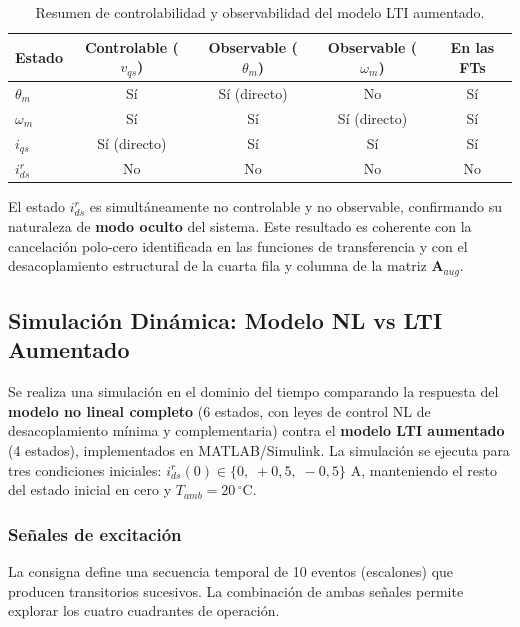 \documentclass[12pt, a4paper,journal, onecolumn, compsoc]{IEEEtran}
\begin{document}
\begin{table}[H]
\centering
\caption{Resumen de controlabilidad y observabilidad del modelo LTI aumentado.}
\label{tab:ctrl_obs}
\renewcommand{\arraystretch}{1.3}
\begin{tabular}{|l|c|c|c|c|}
\hline
\textbf{Estado} & \textbf{Controlable} ($v_{qs}$) & \textbf{Observable} ($\theta_m$) & \textbf{Observable} ($\omega_m$) & \textbf{En las FTs} \\
\hline
$\theta_m$   & Sí & Sí (directo) & No & Sí \\
$\omega_m$   & Sí & Sí           & Sí (directo) & Sí \\
$i_{qs}$     & Sí (directo) & Sí      & Sí & Sí \\
$i_{ds}^r$   & No & No            & No & No \\
\hline
\end{tabular}
\end{table}

El estado $i_{ds}^r$ es simultáneamente no controlable y no observable, confirmando su naturaleza de \textbf{modo oculto} del sistema. Este resultado es coherente con la cancelación polo-cero identificada en las funciones de transferencia y con el desacoplamiento estructural de la cuarta fila y columna de la matriz $\mathbf{A}_{aug}$.

\subsection{Simulación Dinámica: Modelo NL vs LTI Aumentado}
\label{sec:sim_dinamica}

Se realiza una simulación en el dominio del tiempo comparando la respuesta del \textbf{modelo no lineal completo} (6 estados, con leyes de control NL de desacoplamiento mínima y complementaria) contra el \textbf{modelo LTI aumentado} (4 estados), implementados en MATLAB/Simulink. La simulación se ejecuta para tres condiciones iniciales: $i_{ds}^r(0) \in \{0,\; +0{,}5,\; -0{,}5\}$ A, manteniendo el resto del estado inicial en cero y $T_{amb} = 20\,^\circ$C.

\subsubsection{Señales de excitación}

La consigna define una secuencia temporal de 10 eventos (escalones) que producen transitorios sucesivos. La combinación de ambas señales permite explorar los cuatro cuadrantes de operación.
\end{document}
